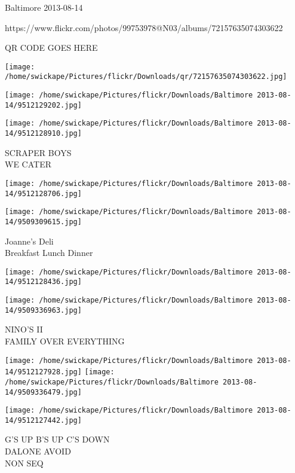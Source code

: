 \documentclass[10pt,letterpaper]{article}
\begin{document}
Baltimore 2013-08-14

https://www.flickr.com/photos/99753978@N03/albums/72157635074303622

QR CODE GOES HERE

\texttt{[image: /home/swickape/Pictures/flickr/Downloads/qr/72157635074303622.jpg]}
\pagebreak

\texttt{[image: /home/swickape/Pictures/flickr/Downloads/Baltimore 2013-08-14/9512129202.jpg]}

\vspace{0.25in}
\texttt{[image: /home/swickape/Pictures/flickr/Downloads/Baltimore 2013-08-14/9512128910.jpg]}

SCRAPER BOYS\\
WE CATER\\
\pagebreak

\texttt{[image: /home/swickape/Pictures/flickr/Downloads/Baltimore 2013-08-14/9512128706.jpg]}

\vspace{0.25in}
\texttt{[image: /home/swickape/Pictures/flickr/Downloads/Baltimore 2013-08-14/9509309615.jpg]}

Joanne's Deli\\
Breakfast Lunch Dinner\\
\pagebreak

\texttt{[image: /home/swickape/Pictures/flickr/Downloads/Baltimore 2013-08-14/9512128436.jpg]}

\vspace{0.25in}
\texttt{[image: /home/swickape/Pictures/flickr/Downloads/Baltimore 2013-08-14/9509336963.jpg]}

NINO'S II\\
FAMILY OVER EVERYTHING\\
\pagebreak

\texttt{[image: /home/swickape/Pictures/flickr/Downloads/Baltimore 2013-08-14/9512127928.jpg]}
\texttt{[image: /home/swickape/Pictures/flickr/Downloads/Baltimore 2013-08-14/9509336479.jpg]}

\vspace{0.25in}
\texttt{[image: /home/swickape/Pictures/flickr/Downloads/Baltimore 2013-08-14/9512127442.jpg]}

G'S UP B'S UP C'S DOWN\\
DALONE AVOID\\
NON SEQ\\
\pagebreak
\end{document}
